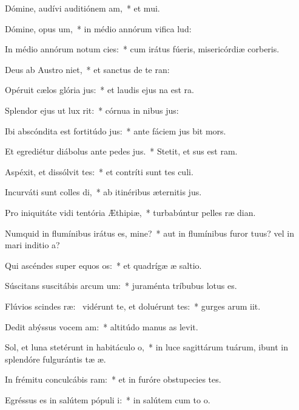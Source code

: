 \item Dómine, audívi auditiónem am,~* et mui.
\item Dómine, opus um,~* in médio annórum vifica lud:
\item In médio annórum notum cies:~* cum irátus fúeris, misericórdiæ corberis.
\item Deus ab Austro niet,~* et sanctus de te ran:
\item Opéruit cælos glória jus:~* et laudis ejus na est ra.
\item Splendor ejus ut lux rit:~* córnua in nibus jus:
\item Ibi abscóndita est fortitúdo jus:~* ante fáciem jus bit mors.
\item Et egrediétur diábolus ante pedes jus.~* Stetit, et sus est ram.
\item Aspéxit, et dissólvit tes:~* et contríti sunt tes culi.
\item Incurváti sunt colles di,~* ab itinéribus æternitis jus.
\item Pro iniquitáte vidi tentória Æthipiæ,~* turbabúntur pelles ræ dian.
\item Numquid in flumínibus irátus es, mine?~* aut in flumínibus furor tuus? vel in mari inditio a?
\item Qui ascéndes super equos os:~* et quadrígæ æ saltio.
\item Súscitans suscitábis arcum um:~* juraménta tríbubus  lotus es.
\item Flúvios scindes ræ:~\pscross{} vidérunt te, et doluérunt tes:~* gurges arum iit.
\item Dedit abýssus vocem am:~* altitúdo manus as levit.
\item Sol, et luna stetérunt in habitáculo o,~* in luce sagittárum tuárum, ibunt in splendóre fulgurántis tæ æ.
\item In frémitu conculcábis ram:~* et in furóre obstupecies tes.
\item Egréssus es in salútem pópuli i:~* in salútem cum to o.
